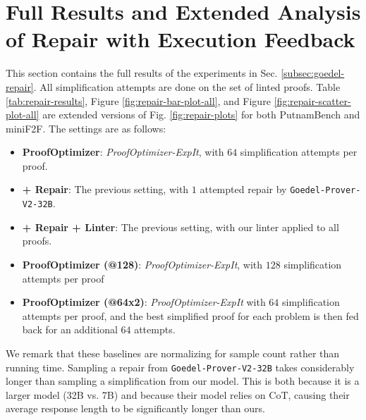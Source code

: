 \newpage

\section{Full Results and Extended Analysis of Repair with Execution Feedback} \label{sec:appendix-execution-repair}
This section contains the full results of the experiments in Sec. \ref{subsec:goedel-repair}. All simplification attempts are done on the set of linted proofs. Table \ref{tab:repair-results}, Figure \ref{fig:repair-bar-plot-all}, and Figure \ref{fig:repair-scatter-plot-all} are extended versions of Fig. \ref{fig:repair-plots} for both PutnamBench and miniF2F. The settings are as follows:

\begin{itemize}
    \item \textbf{ProofOptimizer}: \textit{ProofOptimizer-ExpIt}, with $64$ simplification attempts per proof.
    \item \textbf{+ Repair}: The previous setting, with $1$ attempted repair by \texttt{Goedel-Prover-V2-32B}. 
    \item \textbf{+ Repair + Linter}: The previous setting, with our linter applied to all proofs. 
    \item \textbf{ProofOptimizer (@128)}: \textit{ProofOptimizer-ExpIt}, with $128$ simplification attempts per proof
    \item \textbf{ProofOptimizer (@64x2)}: \textit{ProofOptimizer-ExpIt} with $64$ simplification attempts per proof, and the best simplified proof for each problem is then fed back for an additional $64$ attempts.
\end{itemize}

We remark that these baselines are normalizing for sample count rather than running time. Sampling a repair from \texttt{Goedel-Prover-V2-32B} takes considerably longer than sampling a simplification from our model. This is both because it is a larger model (32B vs. 7B) and because their model relies on CoT, causing their average response length to be significantly longer than ours.

